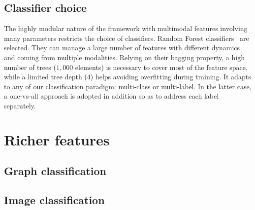     \subsection{Classifier choice}
        The highly modular nature of the framework with multimodal features involving many parameters restricts the choice of classifiers.
        Random Forest classifiers~\parencite{breiman2001random,criminisi2013decision} are selected.
        They can manage a large number of features with different dynamics and coming from multiple modalities.
        Relying on their bagging property, a high number of trees ($1,000$ elements) is necessary to cover most of the feature space, while a limited tree depth ($4$) helps avoiding overfitting during training.
        It adapts to any of our classification paradigm: multi-class or multi-label.
        In the latter case, a one-vs-all approach is adopted in addition so as to address each label separately.

\section{Richer features}
    \subsection{Graph classification}
    \subsection{Image classification}
